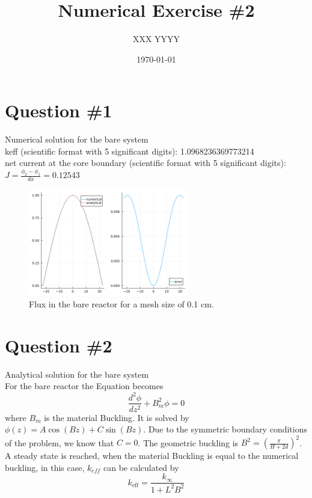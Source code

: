 \documentclass[11pt,a4paper]{article}
\begin{document}
\title{Numerical Exercise \#2}
\author{XXX YYYY\\  %
}
\date{\today}
\maketitle



\newpage
\section{Question \#1}
Numerical solution for the bare system \\
keff (scientific format with 5 significant digits): 1.0968236369773214 \\
net current at the core boundary (scientific format with 5 significant digits): $J = \frac{\phi_{2}-\phi_{1}}{dx}= 0.12543$ \\
\begin{figure}[h]
	\includegraphics[width=7cm]{../../figs/ex2/bare.png}
	\centering
	\caption{Flux in the bare reactor for a mesh size of 0.1 cm.}
\end{figure}

\section{Question \#2}
Analytical solution for the bare system\\
For the bare reactor the Equation becomes
$$
\frac{d^2 \phi}{d z^2}+B_m^2 \phi=0
$$
where $B_{m}$ is the material Buckling. 
It is solved by $\phi(z)=A \cos (B z)+C \sin (B z)$. Due to the symmetric boundary conditions of the problem, we know that $C=0$. The geometric buckling is $B^2=\left(\frac{\pi}{H+2 d}\right)^2$.
A steady state is reached, when the material Buckling is equal to the numerical buckling, in this case, $k_{eff}$ can be calculated by
$$
k_{\mathrm{eff}}=\frac{k_{\infty}}{1+L^2 B^2}
$$
\end{document}
